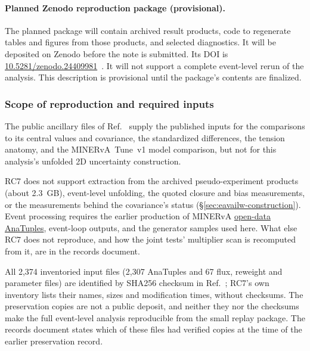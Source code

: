 \paragraph{Planned Zenodo reproduction package (provisional).} The planned package will contain archived result products, code to regenerate tables and figures from those products, and selected diagnostics. It will be deposited on Zenodo before the note is submitted. Its DOI is \href{https://doi.org/10.5281/zenodo.24409981}{10.5281/zenodo.24409981}~\cite{ZenodoDeposit2026}. It will not support a complete event-level rerun of the analysis. This description is provisional until the package's contents are finalized.

\subsubsection{Scope of reproduction and required inputs}
\label{app:release-scope}

The public ancillary files of Ref.~\cite{MINERvA:2021owq} supply the published inputs for the comparisons to its central values and covariance, the standardized differences, the tension anatomy, and the MINERvA~Tune~v1 model comparison, but not for this analysis's unfolded 2D uncertainty construction.

RC7 does not support extraction from the archived pseudo-experiment products (about \SI{2.3}{GB}), event-level unfolding, the quoted closure and bias measurements, or the measurements behind the covariance's status (\S\ref{sec:eavailw-construction}). Event processing requires the earlier production of MINERvA \href{https://doi.org/10.15484/3022562}{open-data AnaTuples}, event-loop outputs, and the generator samples used here. What else RC7 does not reproduce, and how the joint tests' multiplier scan is recomputed from it, are in the records document.

All 2,374 inventoried input files (2,307 AnaTuples and 67 flux, reweight and parameter files) are identified by SHA256 checksum in Ref.~\cite{AnaTuplePreservation2026}; RC7's own inventory lists their names, sizes and modification times, without checksums. The preservation copies are not a public deposit, and neither they nor the checksums make the full event-level analysis reproducible from the small replay package. The records document states which of these files had verified copies at the time of the earlier preservation record.

